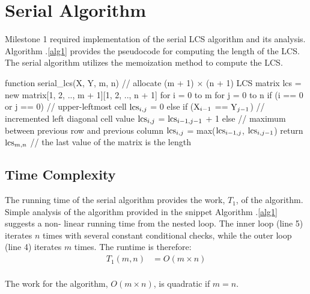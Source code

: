 \documentclass[usletter, 11pt]{extarticle}
\newcommand{\V}[1]{\textup{#1}}
\newcommand{\lcs}{\V{lcs}}
\newcommand{\seqone}{\V{X}}
\newcommand{\seqtwo}{\V{Y}}
\begin{document}
    \section{Serial Algorithm} Milestone 1 required implementation of the
    serial LCS algorithm and its analysis. Algorithm \thesection .\ref{alg1}
    provides the pseudocode for computing the length of the LCS. The serial
    algorithm utilizes the memoization method to compute the LCS.
    \newpage

\begin{pseudocode}[caption={Serial Longest Common Subsequence Length},
label={alg1}]
function serial_lcs(X, Y, m, n)
    // allocate (m + 1) $\times$ (n + 1) LCS matrix
    lcs = new matrix[1, 2, .., m + 1][1, 2, .., n + 1]
    for i = 0 to m
        for j = 0 to n
            if (i == 0 or j == 0) // upper-leftmost cell
                $\lcs_{i, j}$ = 0
            else if ($\seqone_{i - 1}$ == $\seqtwo_{j - 1}$)
                // incremented left diagonal cell value
                $\lcs_{i, j}$ = $\lcs_{i-1, j-1}$ + 1  
            else
                // maximum between previous row and previous column
                $\lcs_{i, j}$ = max($\lcs_{i-1, j}$, $\lcs_{i, j-1}$)
    return $\lcs_{m,n}$  // the last value of the matrix is the length

\end{pseudocode}

        \subsection{Time Complexity} The running time of the serial algorithm
        provides the work, $T_{1}$, of the algorithm. Simple analysis of the
        algorithm provided in the snippet Algorithm \thesection .\ref{alg1}
        suggests a non- linear running time from the nested loop. The inner
        loop (line 5) iterates $n$ times with several constant conditional
        checks, while the outer loop (line 4) iterates $m$ times. The runtime
        is therefore:
        \begin{equation*}
            \begin{split}
                T_1(m, n) & = O(m \times n) \\
            \end{split}
        \end{equation*}

        The work for the algorithm, $O(m \times n)$, is quadratic if $m = n$.
        \newpage
\end{document}
